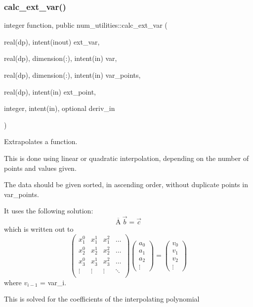 \subsubsection{\texorpdfstring{calc\+\_\+ext\+\_\+var()}{calc\_ext\_var()}}
{\footnotesize\ttfamily integer function, public num\+\_\+utilities\+::calc\+\_\+ext\+\_\+var (\begin{DoxyParamCaption}\item[{real(dp), intent(inout)}]{ext\+\_\+var,  }\item[{real(dp), dimension(\+:), intent(in)}]{var,  }\item[{real(dp), dimension(\+:), intent(in)}]{var\+\_\+points,  }\item[{real(dp), intent(in)}]{ext\+\_\+point,  }\item[{integer, intent(in), optional}]{deriv\+\_\+in }\end{DoxyParamCaption})}



Extrapolates a function. 

This is done using linear or quadratic interpolation, depending on the number of points and values given.

The data should be given sorted, in ascending order, without duplicate points in var\+\_\+points.

It uses the following solution\+: \[\overline{\text{A}} \ \vec{b} = \vec{c}\] which is written out to \[\left(\begin{array}{cccc} x_1^0 & x_1^1 & x_1^2 & \ldots \\ x_2^0 & x_2^1 & x_2^2 & \ldots \\ x_3^0 & x_3^1 & x_3^2 & \ldots \\ \vdots & \vdots & \vdots & \ddots \\ \end{array}\right) \left(\begin{array}{c} a_0 \\ a_1 \\ a_2 \\ \vdots \end{array}\right) = \left(\begin{array}{c} v_0 \\ v_1 \\ v_2 \\ \vdots \end{array}\right) \] where $v_{i-1}$ = {\ttfamily var\+\_\+i}.

This is solved for the coefficients of the interpolating polynomial


